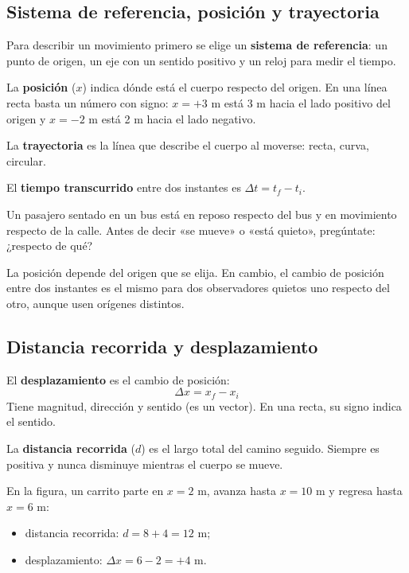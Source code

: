 \subsection{Sistema de referencia, posición y trayectoria}
Para describir un movimiento primero se elige un \textbf{sistema de referencia}: un punto de origen, un eje con un sentido positivo y un reloj para medir el tiempo.

 

La \textbf{posición} ($x$) indica dónde está el cuerpo respecto del origen. En una línea recta basta un número con signo: $x = +3$ m está 3 m hacia el lado positivo del origen y $x = -2$ m está 2 m hacia el lado negativo.

 

La \textbf{trayectoria} es la línea que describe el cuerpo al moverse: recta, curva, circular.

 

El \textbf{tiempo transcurrido} entre dos instantes es $\Delta t = t_f - t_i$.

  
\begin{clave} Un pasajero sentado en un bus está en reposo respecto del bus y en movimiento respecto de la calle. Antes de decir «se mueve» o «está quieto», pregúntate: ¿respecto de qué?\end{clave}
 
\begin{clave}[{Recuerda}] La posición depende del origen que se elija. En cambio, el cambio de posición entre dos instantes es el mismo para dos observadores quietos uno respecto del otro, aunque usen orígenes distintos.\end{clave}
\subsection{Distancia recorrida y desplazamiento}
El \textbf{desplazamiento} es el cambio de posición: \[ \Delta x = x_f - x_i \] Tiene magnitud, dirección y sentido (es un vector). En una recta, su signo indica el sentido.

 

La \textbf{distancia recorrida} ($d$) es el largo total del camino seguido. Siempre es positiva y nunca disminuye mientras el cuerpo se mueve.

 

En la figura, un carrito parte en $x = 2$ m, avanza hasta $x = 10$ m y regresa hasta $x = 6$ m:

 
\begin{itemize}
  \item distancia recorrida: $d = 8 + 4 = 12$ m;
  \item desplazamiento: $\Delta x = 6 - 2 = +4$ m.
\end{itemize}
  
